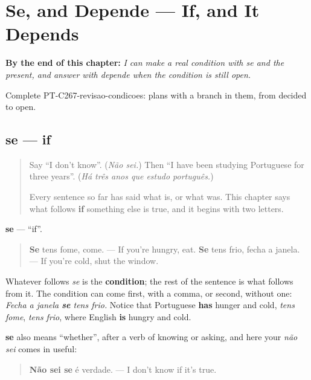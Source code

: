 
\chapter{Se, and Depende --- If, and It Depends}
\label{ch:pt-if-and-it-depends}

\begin{chapteropening}
\textbf{By the end of this chapter:} \emph{I can make a real condition with se and the present, and answer with depende when the condition is still open.}

Complete PT-C267-revisao-condicoes: plans with a branch in them, from decided to open.
\end{chapteropening}

\section[se]{se — if}

\label{lesson:PT-C267-se}



\begin{quote}
Say \textquotedblleft{}I don't know\textquotedblright{}. (\emph{Não sei.}) Then \textquotedblleft{}I have been studying Portuguese for three years\textquotedblright{}. (\emph{Há três anos que estudo português.})

Every sentence so far has said what is, or what was. This chapter says what follows \textbf{if} something else is true, and it begins with two letters.
\end{quote}

\begin{grammarlens}[title={Grammar Lens: se opens a condition}]
\textbf{se} — \textquotedblleft{}if\textquotedblright{}.

\begin{quote}
\textbf{Se} tens fome, come. — If you're hungry, eat. \textbf{Se} tens frio, fecha a janela. — If you're cold, shut the window.
\end{quote}

Whatever follows \emph{se} is the \textbf{condition}; the rest of the sentence is what follows from it. The condition can come first, with a comma, or second, without one: \emph{Fecha a janela \textbf{se} tens frio.} Notice that Portuguese \textbf{has} hunger and cold, \emph{tens fome}, \emph{tens frio}, where English \textbf{is} hungry and cold.

\textbf{se} also means \textquotedblleft{}whether\textquotedblright{}, after a verb of knowing or asking, and here your \emph{não sei} comes in useful:

\begin{quote}
\textbf{Não sei se} é verdade. — I don't know if it's true.
\end{quote}
\end{grammarlens}

